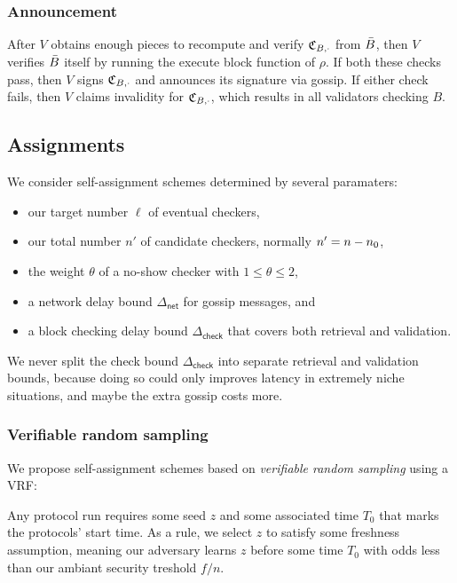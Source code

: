 
\subsubsection{Announcement}

After $V$ obtains enough pieces to recompute and verify $\mathfrak{C}_{B,\cdot}$ from $\bar{B}$, then $V$ verifies $\bar{B}$ itself by running the execute block function of $\rho$.  If both these checks pass, then $V$ signs $\mathfrak{C}_{B,\cdot}$ and announces its signature via gossip.  If either check fails, then $V$ claims invalidity for $\mathfrak{C}_{B,\cdot}$, which results in all validators checking $B$.


\subsection{Assignments}
\label{sec:assignment}

\newcommand\netdelay{\ensuremath{\Delta_{\mathsf{net}}}}
\newcommand\checkdelay{\ensuremath{\Delta_{\mathsf{check}}}}

We consider self-assignment schemes determined by several paramaters:
\begin{itemize}
\item our target number $\ell$ of eventual checkers,
\item our total number $n'$ of candidate checkers, normally $n' = n - n_0$,
\item the weight $\theta$ of a no-show checker with $1 \leq \theta \leq 2$,
\item a network delay bound $\netdelay$ for gossip messages, and
\item a block checking delay bound $\checkdelay$ that covers both retrieval and validation.
\end{itemize}
We never split the check bound $\checkdelay$ into separate retrieval and validation bounds, because doing so could only improves latency in extremely niche situations, and maybe the extra gossip costs more. 

\subsubsection{Verifiable random sampling}

We propose self-assignment schemes based on {\em verifiable random sampling} using a VRF:  

Any protocol run requires some seed $z$ and some associated time $T_0$ that marks the protocols' start time.  As a rule, we select $z$ to satisfy some freshness assumption, meaning our adversary learns $z$ before some time $T_0$ with odds less than our ambiant security treshold $f/n$.


